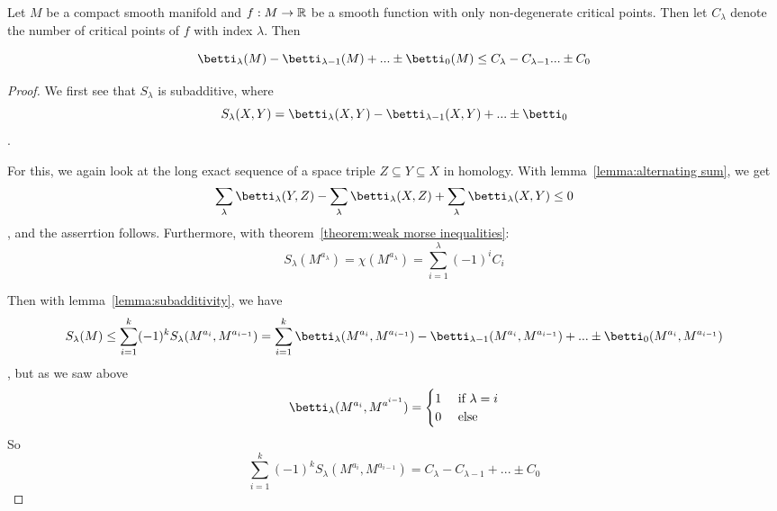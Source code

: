 \begin{theorem}
   \label{theorem:strung morse inequalities}
   Let $M$ be a compact smooth manifold and $f: M \rightarrow {\mathbb R}$ be a smooth 
   function with only non-degenerate critical points. Then let $C_{\lambda}$ 
   denote the number of critical points of $f$ with index $\lambda$. Then
   
   \[ 
      \betti_{\lambda}(M) - \betti_{\lambda - 1}(M) + ... \pm \betti_0(M) 
      \leq C_{\lambda} - C_{\lambda - 1} ... \pm C_0 
   \]

\end{theorem}

\begin{proof}
   We first see that $S_{\lambda}$ is subadditive, where 
   \[ 
      S_{\lambda}(X, Y) 
      = \betti_{\lambda}(X, Y) - \betti_{\lambda - 1}(X, Y) + ... \pm \betti_{0} 
   \].

   For this, we again look at the long exact sequence of a space triple 
   $Z \subseteq Y \subseteq X$ in
    homology. With lemma~\ref{lemma:alternating sum}, we get 
   \[ \sum_{\lambda} \betti_{\lambda}(Y, Z) 
   - \sum_{\lambda} \betti_{\lambda}(X, Z) 
   + \sum_{\lambda} \betti_{\lambda}(X, Y) 
   \leq 0 \]
   , and the asserrtion follows. Furthermore, with 
   theorem~\ref{theorem:weak morse inequalities}: 
   \[ S_{\lambda}(M^{a_{\lambda}}) = \chi(M^{a_{\lambda}}) = \sum_{i=1}^{\lambda} (-1)^i C_i \]
   
   Then with lemma~\ref{lemma:subadditivity}, we have
   \[ 
      S_{\lambda} (M) 
      \leq \sum_{i = 1}^k (-1)^k S_{\lambda}(M^{a_i}, M^{a_{i-1}})
      = \sum_{i = 1}^k \betti_{\lambda}(M^{a_i}, M^{a_{i-1}}) 
         - \betti_{\lambda - 1}(M^{a_i}, M^{a_{i-1}})
         + ... \pm \betti_{0}(M^{a_i}, M^{a_{i-1}})
   \]
   , but as we saw above 
   \[ 
      \betti_{\lambda}(M^{a_i}, M^{a^{i-1}}) = 
         \begin{cases}
            1 & \text{ if } \lambda = i \\
            0 & \text{ else }
         \end{cases}
   \]
   So 
   \[ 
      \sum_{i = 1}^k (-1)^k S_{\lambda}(M^{a_i}, M^{a_{i-1}}) 
      = C_{\lambda} - C_{\lambda - 1} + ... \pm C_0
   \]
\end{proof}
